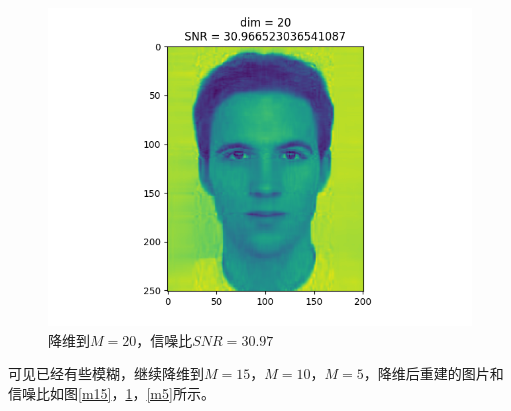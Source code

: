 \begin{figure}[htbp]
\begin{minipage}[t]{0.3\linewidth}
        \includegraphics[width=\textwidth]{figures/Figure_16.png}
        \caption{降维到$M=20$，信噪比$SNR=30.97$}
        \label{m20}
    \end{minipage}
\end{figure}

可见已经有些模糊，继续降维到$M=15$，$M=10$，$M=5$，降维后重建的图片和信噪比如图\ref{m15}，\ref{m20}，\ref{m5}所示。

